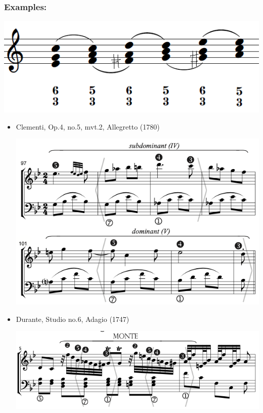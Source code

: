 \documentclass[11pt, openany]{article}
\begin{document}
\subsubsection{Examples:}
\begin{center}
\includegraphics[scale=0.5]{monte.png}
\end{center}
\begin{itemize}
\item Clementi, Op.4, no.5, mvt.2, Allegretto (1780)
\begin{center}
\includegraphics[scale=0.5]{clementi4b.png}
\end{center}
\item Durante, Studio no.6, Adagio (1747)
\begin{center}
\includegraphics[scale=0.5]{durante6.png}

\end{center}
\end{itemize}
\end{document}

